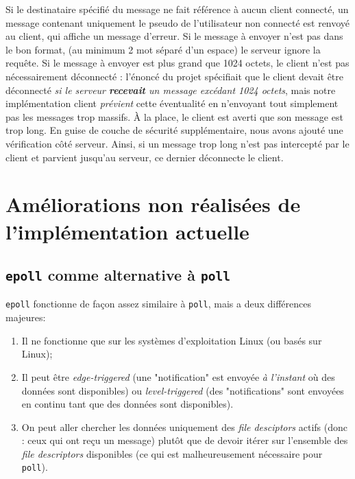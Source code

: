 \documentclass{article}
\begin{document}
\begin{enumerate}
    Si le destinataire spécifié du message ne fait référence à aucun client connecté, un message contenant uniquement le pseudo de l'utilisateur non connecté est renvoyé au client, qui affiche un message d'erreur.
    Si le message à envoyer n'est pas dans le bon format, (au minimum 2 mot séparé d'un espace) le serveur ignore la requête.
    Si le message à envoyer est plus grand que 1024 octets, le client n'est pas nécessairement déconnecté : l'énoncé du projet spécifiait que le client devait être déconnecté \textit{si le serveur \textbf{recevait} un message excédant 1024 octets}, mais notre implémentation client \textit{prévient} cette éventualité en n'envoyant tout simplement pas les messages trop massifs. À la place, le client est averti que son message est trop long. En guise de couche de sécurité supplémentaire, nous avons ajouté une vérification côté serveur. Ainsi, si un message trop long n'est pas intercepté par le client et parvient jusqu'au serveur, ce dernier déconnecte le client.
\end{enumerate}


\section{Améliorations non réalisées de l'implémentation actuelle}
\subsection{\texttt{epoll} comme alternative à \texttt{poll}}
\texttt{epoll} \cite{epoll} fonctionne de façon assez similaire à \texttt{poll}, mais a deux différences majeures:
\begin{enumerate}
    \item Il ne fonctionne que sur les systèmes d'exploitation Linux (ou basés sur Linux);
    \item Il peut être \textit{edge-triggered} (une "notification" est envoyée \textit{à l'instant} où des données sont disponibles) ou \textit{level-triggered} (des "notifications" sont envoyées en continu tant que des données sont disponibles). \cite{LevelEdgeTrigger}
    \item On peut aller chercher les données uniquement des \textit{file desciptors} actifs (donc : ceux qui ont reçu un message) plutôt que de devoir itérer sur l'ensemble des \textit{file descriptors} disponibles (ce qui est malheureusement nécessaire pour \texttt{poll}). \cite{EpollTrigger}
\end{enumerate}
\end{document}
